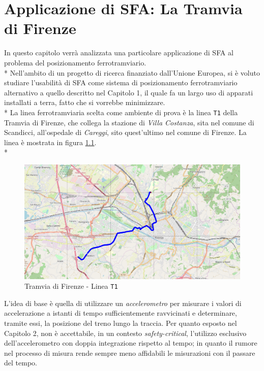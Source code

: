 \chapter{Applicazione di SFA: La Tramvia di Firenze}
In questo capitolo verr\`a analizzata una particolare applicazione di SFA al problema del posizionamento ferrotramviario.\\*
Nell'ambito di un progetto di ricerca finanziato dall'Unione Europea, si \`e voluto studiare l'usabilit\`a di SFA come sistema di posizionamento ferrotramviario alternativo a quello descritto nel Capitolo 1, il quale fa un largo uso di apparati installati a terra, fatto che si vorrebbe minimizzare.\\*
La linea ferrotramviaria scelta come ambiente di prova \`e la linea \texttt{T1} della Tramvia di Firenze, che collega la stazione di \emph{Villa Costanza}, sita nel comune di Scandicci, all'ospedale di \emph{Careggi}, sito quest'ultimo nel comune di Firenze. La linea \`e mostrata in figura \ref{fig:t1}.\\*
\begin{figure}[h]
	\centering
	\includegraphics[width=\linewidth]{img/t1}
	\caption{Tramvia di Firenze - Linea \texttt{T1}}
	\label{fig:t1}
\end{figure}
L'idea di base \`e quella di utilizzare un \emph{accelerometro} per misurare i valori di accelerazione a istanti di tempo sufficientemente ravvicinati e determinare, tramite essi, la posizione del treno lungo la traccia. Per quanto esposto nel Capitolo 2, non \`e accettabile, in un contesto \emph{safety-critical}, l'utilizzo esclusivo dell'accelerometro con doppia integrazione rispetto al tempo; in quanto il rumore nel processo di misura rende sempre meno affidabili le misurazioni con il passare del tempo.
